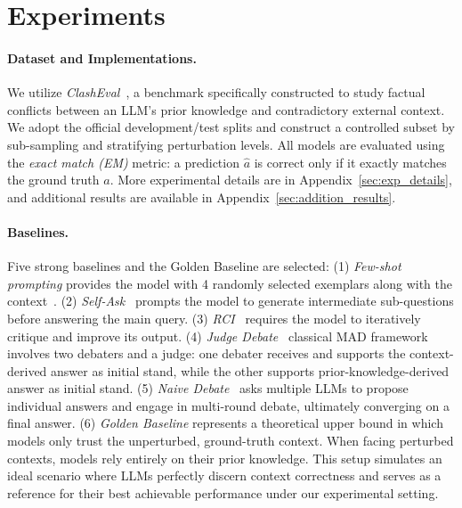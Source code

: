 \documentclass[11pt]{article}
\begin{document}
\section{Experiments}

\paragraph{Dataset and Implementations.} We utilize \textit{ClashEval}~\cite{wu2024clasheval}, a benchmark specifically constructed to study factual conflicts between an LLM's prior knowledge and contradictory external context.  We adopt the official development/test splits and construct a controlled subset by sub-sampling and stratifying perturbation levels.  All models are evaluated using the \textit{exact match (EM)} metric: a prediction $\hat{a}$ is correct only if it exactly matches the ground truth $a$. More experimental details are in Appendix~\ref{sec:exp_details}, and additional results are available in Appendix~\ref{sec:addition_results}. 

\paragraph{Baselines.} Five strong baselines and the Golden Baseline are selected: 
(1) \emph{Few-shot prompting} provides the model with 4 randomly selected exemplars along with the context~\cite{brown2020language}. 
(2) \emph{Self-Ask}~\cite{press2022selfask} prompts the model to generate intermediate sub-questions before answering the main query. 
(3) \emph{RCI}~\cite{kim2023language} requires the model to iteratively critique and improve its output. 
(4) \emph{Judge Debate}~\cite{liang2023encouraging} classical MAD framework involves two debaters and a judge: one debater receives and supports the context-derived answer as initial stand, while the other supports prior-knowledge-derived answer as initial stand. 
(5) \emph{Naive Debate}~\cite{du2023improving} asks multiple LLMs to propose individual answers and engage in multi-round debate, ultimately converging on a final answer. (6) \emph{Golden Baseline} represents a theoretical upper bound in which models only trust the unperturbed, ground-truth context. When facing perturbed contexts, models rely entirely on their prior knowledge. This setup simulates an ideal scenario where LLMs perfectly discern context correctness and serves as a reference for their best achievable performance under our experimental setting.

\end{document}
